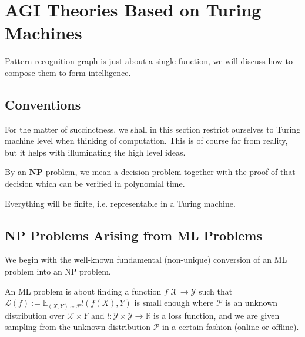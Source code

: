 \documentclass[11pt, oneside]{article}   	%
\theoremstyle{definition}
\begin{document}
\section{AGI Theories Based on Turing Machines}

Pattern recognition graph is just about a single function, we will discuss how to compose them to form intelligence.

\subsection{Conventions}

For the matter of succinctness, we shall in this section restrict ourselves to Turing machine level when thinking of computation. This is of course far from reality, but it helps with illuminating the high level ideas.

By an $\textbf{NP}$ problem, we mean a decision problem together with the proof of that decision which can be verified in polynomial time.

Everything will be finite, i.e. representable in a Turing machine.

\subsection{NP Problems Arising from ML Problems}
\begin{center}
\end{center}

We begin with the well-known fundamental (non-unique) conversion of an ML problem into an NP problem.

An ML problem is about finding a function $f$ $\mathcal{X}\to \mathcal{Y}$ such that $\mathscr{L}(f):=\mathbb{E}_{(X,Y)\sim \mathcal{P}}l(f(X), Y)$ is small enough where $\mathcal{P}$ is an unknown distribution over $\mathcal{X}\times Y$ and $l:\mathcal{Y}\times \mathcal{Y} \to \mathbb{R}$ is a loss function, and we are given sampling from the unknown distribution $\mathcal{P}$ in a certain fashion (online or offline).
\end{document}
